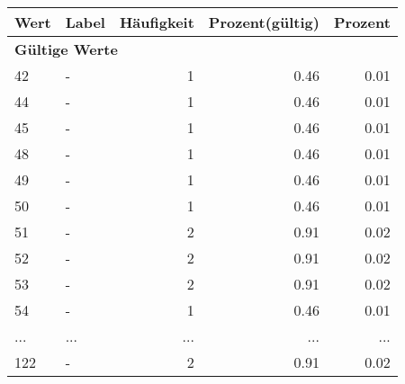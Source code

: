      \begin{longtable}{lXrrr}
     \toprule
     \textbf{Wert} & \textbf{Label} & \textbf{Häufigkeit} & \textbf{Prozent(gültig)} & \textbf{Prozent} \\
     \endhead
     \midrule
     \multicolumn{5}{l}{\textbf{Gültige Werte}}\\
        42 & \multicolumn{1}{X}{-} & %
          \num{1} &
          \num[round-mode=places,round-precision=2]{0.46} &
          \num[round-mode=places,round-precision=2]{0.01} \\
        44 & \multicolumn{1}{X}{-} & %
          \num{1} &
          \num[round-mode=places,round-precision=2]{0.46} &
          \num[round-mode=places,round-precision=2]{0.01} \\
        45 & \multicolumn{1}{X}{-} & %
          \num{1} &
          \num[round-mode=places,round-precision=2]{0.46} &
          \num[round-mode=places,round-precision=2]{0.01} \\
        48 & \multicolumn{1}{X}{-} & %
          \num{1} &
          \num[round-mode=places,round-precision=2]{0.46} &
          \num[round-mode=places,round-precision=2]{0.01} \\
        49 & \multicolumn{1}{X}{-} & %
          \num{1} &
          \num[round-mode=places,round-precision=2]{0.46} &
          \num[round-mode=places,round-precision=2]{0.01} \\
        50 & \multicolumn{1}{X}{-} & %
          \num{1} &
          \num[round-mode=places,round-precision=2]{0.46} &
          \num[round-mode=places,round-precision=2]{0.01} \\
        51 & \multicolumn{1}{X}{-} & %
          \num{2} &
          \num[round-mode=places,round-precision=2]{0.91} &
          \num[round-mode=places,round-precision=2]{0.02} \\
        52 & \multicolumn{1}{X}{-} & %
          \num{2} &
          \num[round-mode=places,round-precision=2]{0.91} &
          \num[round-mode=places,round-precision=2]{0.02} \\
        53 & \multicolumn{1}{X}{-} & %
          \num{2} &
          \num[round-mode=places,round-precision=2]{0.91} &
          \num[round-mode=places,round-precision=2]{0.02} \\
        54 & \multicolumn{1}{X}{-} & %
          \num{1} &
          \num[round-mode=places,round-precision=2]{0.46} &
          \num[round-mode=places,round-precision=2]{0.01} \\
       ... & ... & ... & ... & ... \\
        122 & \multicolumn{1}{X}{-} & %
          \num{2} &
          \num[round-mode=places,round-precision=2]{0.91} &
          \num[round-mode=places,round-precision=2]{0.02} \\


\end{longtable}
